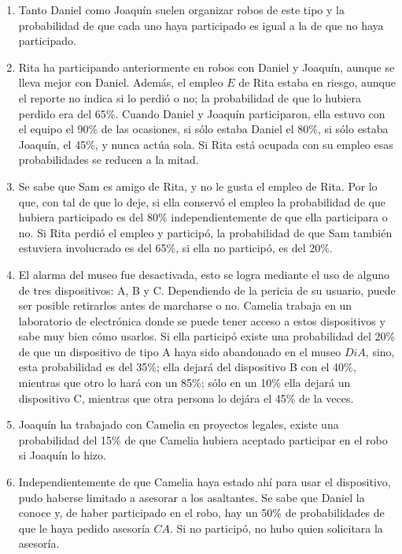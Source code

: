 \begin{enumerate}

 \item Tanto Daniel como Joaquín suelen organizar robos de este tipo y la probabilidad de que cada uno haya participado es igual a la de que no haya participado.

 \item Rita ha participando anteriormente en robos con Daniel y Joaquín, aunque se lleva mejor con Daniel.  Además, el empleo $E$ de Rita estaba en riesgo, aunque el reporte no indica si lo perdió o no; la probabilidad de que lo hubiera perdido era del 65\%.  Cuando Daniel y Joaquín participaron, ella estuvo con el equipo el 90\% de las ocasiones, si sólo estaba Daniel el 80\%, si sólo estaba Joaquín, el 45\%, y nunca actúa sola.  Si Rita está ocupada con su empleo esas probabilidades se reducen a la mitad.

 \item Se sabe que Sam es amigo de Rita, y no le gusta el empleo de Rita.  Por lo que, con tal de que lo deje, si ella conservó el empleo la probabilidad de que hubiera participado es del 80\% independientemente de que ella participara o no.  Si Rita perdió el empleo y participó, la probabilidad de que Sam también estuviera involucrado es del 65\%, si ella no participó, es del 20\%.

 \item  El alarma del museo fue desactivada, esto se logra mediante el uso de alguno de tres dispositivos: A, B y C.  Dependiendo de la pericia de su usuario, puede ser posible retirarlos antes de marcharse o no.   Camelia trabaja en un laboratorio de electrónica donde se puede tener acceso a estos dispositivos y sabe muy bien cómo usarlos.  Si ella participó existe una probabilidad del 20\% de que un dispositivo de tipo A haya sido abandonado en el museo $DiA$, sino, esta probabilidad es del 35\%; ella dejará del dispositivo B con el  40\%, mientras que otro lo hará con un  85\%; sólo en un 10\% ella dejará un dispositivo C, mientras que otra persona lo dejára el 45\% de la veces.

 \item Joaquín ha trabajado con Camelia en proyectos legales, existe una probabilidad del 15\% de que Camelia hubiera aceptado participar en el robo si Joaquín lo hizo.

 \item Independientemente de que Camelia haya estado ahí para usar el dispositivo, pudo haberse limitado a asesorar a los asaltantes. Se sabe que Daniel la conoce y, de haber participado en el robo, hay un 50\% de probabilidades de que le haya pedido asesoría $CA$. Si no participó, no hubo quien solicitara la asesoría.


\end{enumerate}
